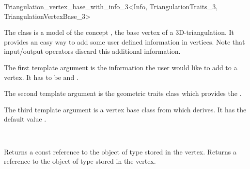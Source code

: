 

\begin{ccRefClass}{Triangulation_vertex_base_with_info_3<Info, TriangulationTraits_3, TriangulationVertexBase_3>}

\ccDefinition

The class  is a model of the concept
, the base vertex of a 3D-triangulation.
It provides an easy way to add some user defined information in vertices.
Note that input/output operators discard this additional information.


\ccParameters

The first template argument is the information the user would like to add
to a vertex.  It has to be  and .

The second template argument is the geometric traits class
 which provides the .

The third template argument is a vertex base class from which
 derives.  It has the default
value .

\ccIsModel 
{}\\

\ccInheritsFrom {}

\ccTypes
{}


\ccAccessFunctions
{}
\ccTagFullDeclarations

{Returns a const reference to the object of type  stored in the
vertex.}
\ccGlue
{}
{Returns a reference to the object of type  stored in the vertex.}
\ccSeeAlso

\\

\end{ccRefClass}
